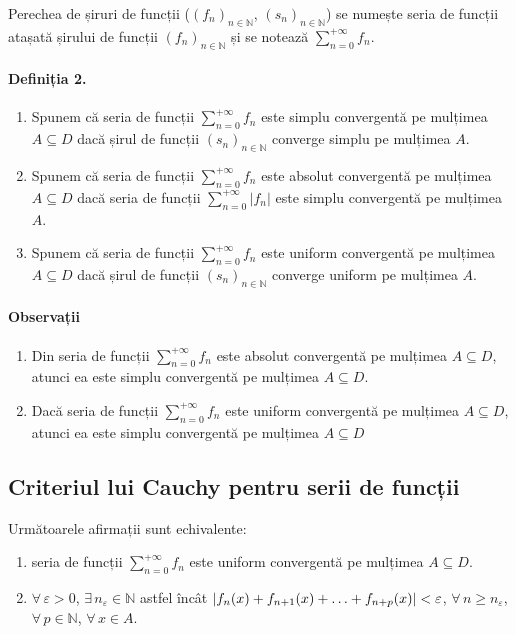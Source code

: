 Perechea de șiruri de funcții ($(f_{n})_{n \in \mathbb{N}}$, $(s_{n})_{n \in
\mathbb{N}}$) se numește seria de funcții atașată șirului de funcții
$(f_{n})_{n \in \mathbb{N}}$ și se notează
$\displaystyle\sum_{n=0}^{+\infty} f_{n}$.

\paragraph*{Definiția 2.}
\begin{enumerate}[label=\emph{\alph*})]
    \item Spunem că seria de funcții $\displaystyle\sum_{n =
	    0}^{+\infty}f_{n}$ este simplu convergentă pe mulțimea $A
	    \subseteq D$ dacă șirul de funcții $(s_{n})_{n \in \mathbb{N}}$
	    converge simplu pe mulțimea $A$.
    \item Spunem că seria de funcții $\displaystyle\sum_{n =
	    0}^{+\infty}f_{n}$ este absolut convergentă pe mulțimea $A
	    \subseteq D$ dacă seria de funcții $\displaystyle\sum_{n =
	    0}^{+\infty} \lvert f_{n} \rvert$ este simplu convergentă pe
	    mulțimea $A$.
    \item Spunem că seria de funcții $\displaystyle\sum_{n =
	    0}^{+\infty}f_{n}$ este uniform convergentă pe mulțimea $A
	    \subseteq D$ dacă șirul de funcții $(s_{n})_{n \in \mathbb{N}}$
	    converge uniform pe mulțimea $A$.
\end{enumerate}

\paragraph*{Observații}
\begin{enumerate}[label=\emph{\alph*})]
    \item Din seria de funcții $\displaystyle\sum_{n = 0}^{+\infty}f_{n}$
	    este absolut convergentă pe mulțimea $A \subseteq D$, atunci ea
	    este simplu convergentă pe mulțimea $A \subseteq D$.
    \item Dacă seria de funcții $\displaystyle\sum_{n = 0}^{+\infty}f_{n}$
	    este uniform convergentă pe mulțimea $A \subseteq D$, atunci ea
	    este simplu convergentă pe mulțimea $A \subseteq D$
\end{enumerate}

\subsection{Criteriul lui Cauchy pentru serii de funcții}
Următoarele afirmații sunt echivalente:
\begin{enumerate}[label=\emph{\alph*})]
    \item seria de funcții $\displaystyle\sum_{n = 0}^{+\infty}f_{n}$ este
	    uniform convergentă pe mulțimea $A \subseteq D$.
    \item $\forall \, \varepsilon > 0$, $\exists \, n_{\varepsilon} \in
	    \mathbb{N}$ astfel încât $\lvert f_{n}(x) + f_{n+1}(x) +
	    \mathellipsis + f_{n+p}(x) \rvert < \varepsilon$, $\forall \, n
	    \geq n_{\varepsilon}$, $\forall \, p \in \mathbb{N}$, $\forall
	    \, x \in A$.
\end{enumerate}

